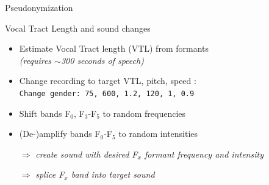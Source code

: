 \documentclass[xcolor={dvipsnames}]{beamer}
\begin{document}
\begin{frame}{Pseudonymization}

    \begin{figure}[htb]
        \centering
    \end{figure}

\end{frame}

\begin{frame}{Vocal Tract Length and sound changes}

\begin{itemize}
    \item Estimate Vocal Tract length (VTL) from formants \cite{lammert_short-time_2015}\\
          \textit{(requires $\sim$300 seconds of speech)}
    \item Change recording to target VTL, pitch, speed \cite{boersma_praat:_2017}: \\
            {\texttt{Change gender: 75, 600, 1.2, 120, 1, 0.9}}
    \item Shift bands F$_0$, F$_3$-F$_5$ to random frequencies
    \item (De-)amplify bands F$_0$-F$_5$ to random intensities
    \item[$\Rightarrow$] \textit{create sound with desired F$_x$ formant frequency and intensity}
    \item[$\Rightarrow$] \textit{splice F$_x$ band into target sound}
\end{itemize}

\let\thefootnote\relax{}
\end{frame}
\end{document}
